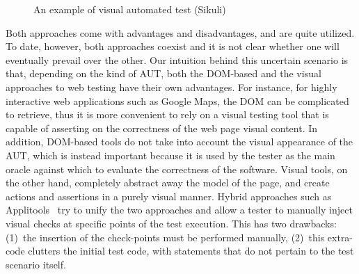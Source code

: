 \begin{figure}[b]
\centering
{}
\caption{An example of visual automated test (Sikuli)}
\label{fig:visual}
\end{figure}

Both approaches come with advantages and disadvantages, and are quite utilized. %
To date, however, both approaches coexist and it is not clear whether one will eventually prevail over the other. Our intuition behind this uncertain scenario is that, depending on the kind of AUT, both the DOM-based and the visual approaches to web testing have their own advantages. For instance, for highly interactive web applications such as Google Maps, the DOM can be complicated to retrieve, thus it is more convenient to rely on a visual testing tool that is capable of asserting on the correctness of the web page visual content.
In addition, DOM-based tools do not take into account the visual appearance of the AUT, which is instead important because it is used by the tester as the main oracle against which to evaluate the correctness of the software. Visual tools, on the other hand, completely abstract away the model of the page, and create actions and assertions in a purely visual manner. 
%
Hybrid approaches such as Applitools~\cite{applitools} try to unify the two approaches and allow a tester to manually inject visual checks at specific points of the test execution. This has two drawbacks: (1)~the insertion of the check-points must be performed manually, (2)~this extra-code clutters the initial test code, with statements that do not pertain to the test scenario itself.

